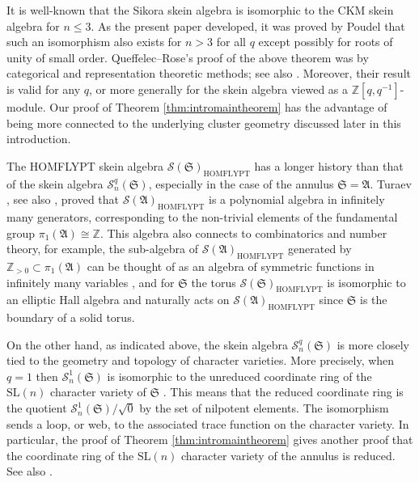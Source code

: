 \documentclass[12pt,
	]{amsart}
\theoremstyle{definition}
\newcommand{\mrm}[1]{\mathrm{#1}}
\newcommand{\mbb}[1]{\mathbb{#1}}
\newcommand{\mcal}[1]{\mathcal{#1}}
\newcommand{\mfrak}[1]{\mathfrak{#1}}
\newcommand{\Z}{\mbb{Z}}
\newcommand{\nsl}{\mrm{SL}(n)}
\newcommand{\sk}{\mcal{S}_n^q}
\newcommand{\ann}{\mfrak{A}}
\newcommand{\surf}{\mfrak{S}}
\begin{document}
It is well-known \cite{SikoraAlgGeomTop05} that the Sikora skein algebra is isomorphic to the CKM skein algebra for $n\leq3$.  As the present paper developed, it was proved by Poudel \cite{poudel2023comparisonslnspidercategories} that such an isomorphism also exists for $n>3$ for all $q$ except possibly for roots of unity of small order. Queffelec--Rose's proof of the above theorem was by categorical and representation theoretic methods; see also \cite{queffelecMR4715537}.  Moreover, their result is valid for any $q$, or more generally for the skein algebra viewed as a $\Z[q,q^{-1}]$-module.  Our proof of Theorem \ref{thm:intromaintheorem} has the advantage of being more connected to the underlying cluster geometry discussed later in this introduction.

The HOMFLYPT skein algebra $\mcal{S}(\surf)_\mathrm{HOMFLYPT}$ has a longer history than that of the skein algebra $\sk(\surf)$, especially in the case of the annulus $\surf=\ann$.  Turaev \cite{turaevMR0964255}, see also \cite{lickorishMR0918536}, proved that $\mcal{S}(\ann)_\mathrm{HOMFLYPT}$ is a polynomial algebra in infinitely many generators, corresponding to the non-trivial elements of the fundamental group $\pi_1(\ann)\cong\mbb{Z}$.  This algebra also connects to combinatorics and number theory, for example, the sub-algebra of $\mcal{S}(\ann)_\mathrm{HOMFLYPT}$ generated by $\Z_{>0}\subset\pi_1(\ann)$ can be thought of as an algebra of symmetric functions in infinitely many variables \cite{mortonMR1983094, mortonMR2439627}, and for $\surf$ the torus $\mcal{S}(\surf)_\mathrm{HOMFLYPT}$ is isomorphic to an elliptic Hall algebra \cite{mortonMR3626565} and naturally acts on $\mcal{S}(\ann)_\mathrm{HOMFLYPT}$ since $\surf$ is the boundary of a solid torus.  

On the other hand, as indicated above, the skein algebra $\sk(\surf)$ is more closely tied to the geometry and topology of character varieties.  More precisely, when $q=1$ then $\mcal{S}_n^1(\surf)$ is isomorphic to the unreduced coordinate ring of the $\nsl$ character variety of $\surf$ \cite{bullock1997rings, PrzytyckiBullPolishAcad91, SikoraTrans01}.  This means that the reduced coordinate ring is the quotient $\mcal{S}_n^1(\surf)/\sqrt{0}$ by the set of nilpotent elements.  The isomorphism sends a loop, or web, to the associated trace function on the character variety.  In particular, the proof of Theorem \ref{thm:intromaintheorem} gives another proof that the coordinate ring of the $\nsl$ character variety of the annulus is reduced.  See also \cite{FLORENTINO201432, sikora2014}.  
\end{document}
